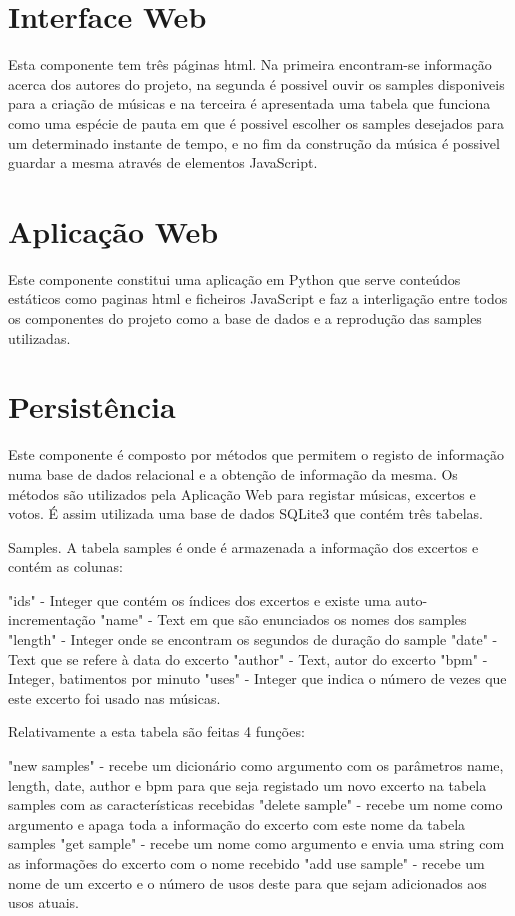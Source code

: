 \documentclass[a4paper]{report}
\begin{document}
\section{Interface Web}

Esta componente tem três páginas \ac{html}. Na primeira encontram-se informação acerca dos autores do projeto, na segunda é possivel ouvir os samples disponiveis para a criação de músicas e na terceira é apresentada uma tabela que funciona como uma espécie de pauta em que é possivel escolher os samples desejados para um determinado instante de tempo, e no fim da construção da música é possivel guardar a mesma através de elementos JavaScript.

\section{Aplicação Web}

Este componente constitui uma aplicação em Python que serve conteúdos estáticos como paginas \ac{html} e ficheiros JavaScript e faz a interligação entre todos os componentes do projeto como a base de dados e a reprodução das samples utilizadas. 



\section{Persistência}

Este componente é composto por métodos que permitem o registo de informação
numa base de dados relacional e a obtenção de informação da mesma. Os métodos são utilizados pela Aplicação Web para registar músicas, excertos e votos.
É assim utilizada uma base de dados SQLite3 que contém três tabelas.

Samples.
A tabela samples é onde é armazenada a informação dos excertos e contém as colunas:

"ids" - Integer que contém os índices dos excertos e existe uma auto-incrementação
"name" - Text em que são enunciados os nomes dos samples
"length" - Integer onde se encontram os segundos de duração do sample
"date" - Text que se refere à data do excerto
"author" - Text, autor do excerto
"bpm" - Integer, batimentos por minuto
"uses" - Integer que indica o número de vezes que este excerto foi usado nas músicas.

Relativamente a esta tabela são feitas 4 funções:

"new samples" - recebe um dicionário como argumento com os parâmetros name, length, date, author e bpm para que seja registado um novo excerto na tabela samples com as características recebidas
"delete sample" - recebe um nome como argumento e apaga toda a informação do excerto com este nome da tabela samples
"get sample" - recebe um nome como argumento e envia uma string com as informações do excerto com o nome recebido
"add use sample" - recebe um nome de um excerto e o número de usos deste para que sejam adicionados aos usos atuais.
\end{document}
